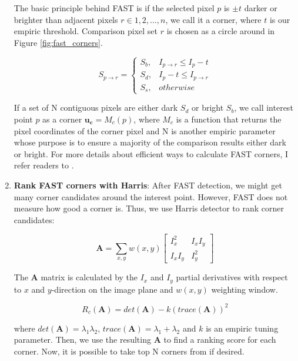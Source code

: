 \documentclass[a4paper]{report}
\numberwithin{figure}{section}
\begin{document}
\begin{appendices}
\begin{enumerate}
	The basic principle behind FAST is if the selected pixel $p$ is $\pm t$ 
	darker or brighter than adjacent pixels $r\in{1,2,\dots,n}$, we call it a 
	corner, where $t$ is our empiric threshold. Comparison pixel set $r$ is 
	chosen as a circle around in Figure \ref{fig:fast_corners}.
	
	\begin{equation}
	S_{p \rightarrow r} = 
	\begin{cases}
	S_b, & I_{p \rightarrow r} \leq I_p - t \\
	S_d, & I_p - t \leq I_{p \rightarrow r} \\
	S_s, & otherwise
	\end{cases}
	\end{equation}
	
	If a set of N contiguous pixels are either dark $S_d$ or bright $S_b$, we 
	call interest point $p$ as a corner $\mathbf{u_c} = M_c(p)$, where $M_c$ 
	is a function that returns the pixel coordinates of the corner pixel and N 
	is another empiric parameter whose purpose is to ensure a majority of the 
	comparison results either dark or bright. For more details about efficient 
	ways to 
	calculate FAST corners, I refer readers to \parencite{Rosten2006}.
	
	\item \textbf{Rank FAST corners with Harris}: After FAST detection, we 
	might get many corner candidates around the interest point. However, FAST 
	does not measure how good a corner is. Thus, we use Harris detector to 
	rank corner candidates:
	
	\begin{equation}
	\mathbf{A} = \sum_{x,y} w(x,y) 
	\begin{bmatrix}
	I_x^2 & I_xI_y \\ I_xI_y & I_y^2
	\end{bmatrix}
	\end{equation}
	
	The $\mathbf{A}$ matrix is calculated by the $I_x$ and $I_y$ partial 
	derivatives with respect to $x$ and $y$-direction on the image plane and 
	$w(x,y)$ weighting window.
	
	\begin{equation}
	R_c(\mathbf{A}) = det(\mathbf{A}) - k(trace(\mathbf{A}))^2
	\end{equation}
	
	where $det(\mathbf{A}) = \lambda_1 \lambda_2$, $trace(\mathbf{A}) = 
	\lambda_1 + \lambda_2$ and $k$ is an empiric tuning parameter. Then, we 
	use the resulting $\mathbf{A}$ to find a ranking score for each corner. 
	Now, it is possible to take top N corners from if desired.
	

\end{enumerate}
\end{appendices}
\end{document}
